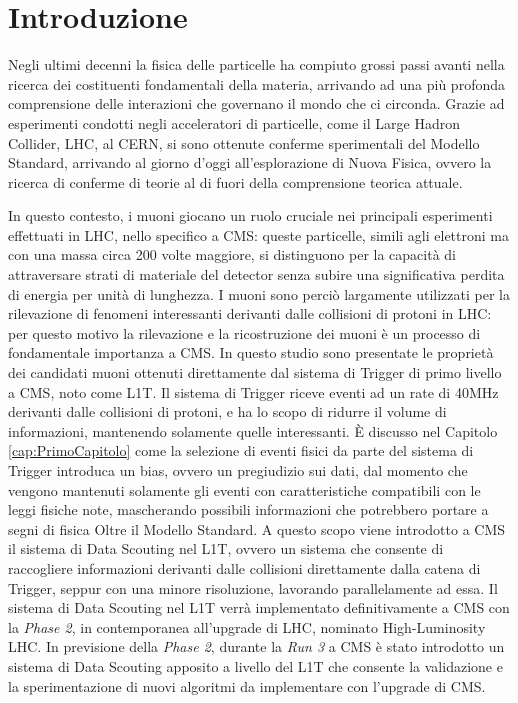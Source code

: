 \chapter{Introduzione}
\label{cap:Introduzione}

Negli ultimi decenni la fisica delle particelle ha compiuto grossi passi avanti nella ricerca dei costituenti fondamentali della materia, arrivando ad una più profonda comprensione delle interazioni che governano il mondo che ci circonda. Grazie ad esperimenti condotti negli acceleratori di particelle, come il Large Hadron Collider, LHC, al CERN, si sono ottenute conferme sperimentali del Modello Standard, arrivando al giorno d'oggi all'esplorazione di Nuova Fisica, ovvero la ricerca di conferme di teorie al di fuori della comprensione teorica attuale.

In questo contesto, i muoni giocano un ruolo cruciale nei principali esperimenti effettuati in LHC, nello specifico a CMS: queste particelle, simili agli elettroni ma con una massa circa 200 volte maggiore, si distinguono per la capacità di attraversare strati di materiale del detector senza subire una significativa perdita di energia per unità di lunghezza. I muoni sono perciò largamente utilizzati per la rilevazione di fenomeni interessanti derivanti dalle collisioni di protoni in LHC: per questo motivo la rilevazione e la ricostruzione dei muoni è un processo di fondamentale importanza a CMS.\newline
In questo studio sono presentate le proprietà dei candidati muoni ottenuti direttamente dal sistema di Trigger di primo livello a CMS, noto come L1T. Il sistema di Trigger riceve eventi ad un rate di 40MHz derivanti dalle collisioni di protoni, e ha lo scopo di ridurre il volume di informazioni, mantenendo solamente quelle interessanti.
È discusso nel Capitolo \ref{cap:PrimoCapitolo} come la selezione di eventi fisici da parte del sistema di Trigger introduca un bias, ovvero un pregiudizio sui dati, dal momento che vengono mantenuti solamente gli eventi con caratteristiche compatibili con le leggi fisiche note, mascherando possibili informazioni che potrebbero portare a segni di fisica Oltre il Modello Standard. A questo scopo viene introdotto a CMS il sistema di Data Scouting nel L1T, ovvero un sistema che consente di raccogliere informazioni derivanti dalle collisioni direttamente dalla catena di Trigger, seppur con una minore risoluzione, lavorando parallelamente ad essa. Il sistema di Data Scouting nel L1T verrà implementato definitivamente a CMS con la \textit{Phase 2}, in contemporanea all'upgrade di LHC, nominato High-Luminosity LHC. In previsione della \textit{Phase 2}, durante la \textit{Run 3} a CMS è stato introdotto un sistema di Data Scouting apposito a livello del L1T che consente la validazione e la sperimentazione di nuovi algoritmi da implementare con l'upgrade di CMS.


